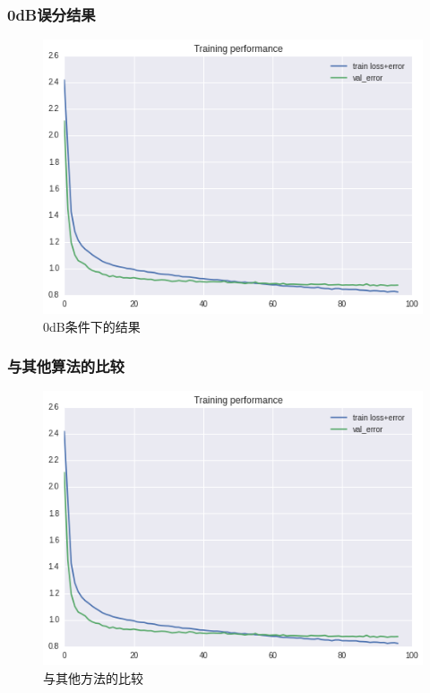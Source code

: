 \subsubsection*{0dB误分结果}
\begin{figure}[!h]
	\centering
	\includegraphics[scale=0.3]{figures/chapter_3/loss}
	\caption{0dB条件下的结果}	\label{sec:fig_3_10}
\end{figure}

\subsubsection*{与其他算法的比较}
\begin{figure}[!h]
	\centering
	\includegraphics[scale=0.3]{figures/chapter_3/loss}
	\caption{与其他方法的比较}	\label{sec:fig_3_11}
\end{figure}

